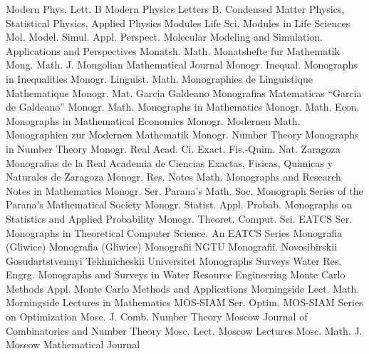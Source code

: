 {Modern Phys. Lett. B}
{Modern Physics Letters B. Condensed Matter Physics, Statistical Physics, Applied Physics}
{Modules Life Sci.}
{Modules in Life Sciences}
{Mol. Model. Simul. Appl. Perspect.}
{Molecular Modeling and Simulation. Applications and Perspectives}
{Monatsh. Math.}
{Monatshefte fur Mathematik}
{Mong. Math. J.}
{Mongolian Mathematical Journal}
{Monogr. Inequal.}
{Monographs in Inequalities}
{Monogr. Linguist. Math.}
{Monographies de Linguistique Mathematique}
{Monogr. Mat. Garcia Galdeano}
{Monografias Matematicas ``Garcia de Galdeano''}
{Monogr. Math.}
{Monographs in Mathematics}
{Monogr. Math. Econ.}
{Monographs in Mathematical Economics}
{Monogr. Modernen Math.}
{Monographien zur Modernen Mathematik}
{Monogr. Number Theory}
{Monographs in Number Theory}
{Monogr. Real Acad. Ci. Exact. Fis.-Quim. Nat. Zaragoza}
{Monografias de la Real Academia de Ciencias Exactas, Fisicas, Quimicas y Naturales de Zaragoza}
{Monogr. Res. Notes Math.}
{Monographs and Research Notes in Mathematics}
{Monogr. Ser. Parana's Math. Soc.}
{Monograph Series of the Parana's Mathematical Society}
{Monogr. Statist. Appl. Probab.}
{Monographs on Statistics and Applied Probability}
{Monogr. Theoret. Comput. Sci. EATCS Ser.}
{Monographs in Theoretical Computer Science. An EATCS Series}
{Monografia (Gliwice)}
{Monografia (Gliwice)}
{Monografii NGTU}
{Monografii. Novosibirskii Gosudartstvennyi Tekhnicheskii Universitet}
{Monographs Surveys Water Res. Engrg.}
{Monographs and Surveys in Water Resource Engineering}
{Monte Carlo Methods Appl.}
{Monte Carlo Methods and Applications}
{Morningside Lect. Math.}
{Morningside Lectures in Mathematics}
{MOS-SIAM Ser. Optim.}
{MOS-SIAM Series on Optimization}
{Mosc. J. Comb. Number Theory}
{Moscow Journal of Combinatorics and Number Theory}
{Mosc. Lect.}
{Moscow Lectures}
{Mosc. Math. J.}
{Moscow Mathematical Journal}

